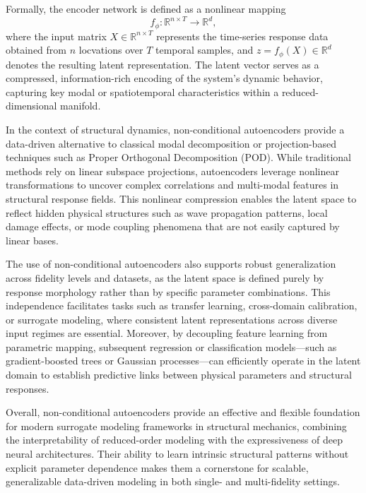 \documentclass[12pt,a4paper]{report}
\begin{document}
\noindent
Formally, the encoder network is defined as a nonlinear mapping
\begin{equation}
    f_{\phi}: \mathbb{R}^{n \times T} \rightarrow \mathbb{R}^{d},
\end{equation}
where the input matrix \( X \in \mathbb{R}^{n \times T} \) represents the time-series response data obtained from \( n \) locvations over \( T \) temporal samples, and \( z = f_{\phi}(X) \in \mathbb{R}^{d} \) denotes the resulting latent representation. The latent vector serves as a compressed, information-rich encoding of the system’s dynamic behavior, capturing key modal or spatiotemporal characteristics within a reduced-dimensional manifold.

\noindent
In the context of structural dynamics, non-conditional autoencoders provide a data-driven alternative to classical modal decomposition or projection-based techniques such as Proper Orthogonal Decomposition (POD). While traditional methods rely on linear subspace projections, autoencoders leverage nonlinear transformations to uncover complex correlations and multi-modal features in structural response fields. This nonlinear compression enables the latent space to reflect hidden physical structures such as wave propagation patterns, local damage effects, or mode coupling phenomena that are not easily captured by linear bases.

\noindent
The use of non-conditional autoencoders also supports robust generalization across fidelity levels and datasets, as the latent space is defined purely by response morphology rather than by specific parameter combinations. This independence facilitates tasks such as transfer learning, cross-domain calibration, or surrogate modeling, where consistent latent representations across diverse input regimes are essential. Moreover, by decoupling feature learning from parametric mapping, subsequent regression or classification models---such as gradient-boosted trees or Gaussian processes---can efficiently operate in the latent domain to establish predictive links between physical parameters and structural responses.

\noindent
Overall, non-conditional autoencoders provide an effective and flexible foundation for modern surrogate modeling frameworks in structural mechanics, combining the interpretability of reduced-order modeling with the expressiveness of deep neural architectures. Their ability to learn intrinsic structural patterns without explicit parameter dependence makes them a cornerstone for scalable, generalizable data-driven modeling in both single- and multi-fidelity settings.
\end{document}
